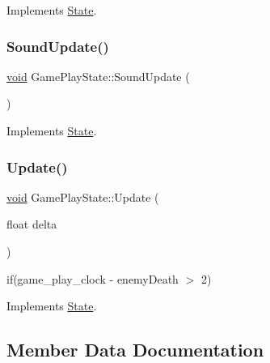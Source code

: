 Implements \hyperlink{classState_a0e48dfae1e3090630475812681417c5f}{State}.

\mbox{\label{classGamePlayState_a3367714db85b4d59a52bc1d8b0828d3c}} 
\subsubsection{\texorpdfstring{Sound\+Update()}{SoundUpdate()}}
{\footnotesize\ttfamily \hyperlink{imgui__impl__opengl3__loader_8h_ac668e7cffd9e2e9cfee428b9b2f34fa7}{void} Game\+Play\+State\+::\+Sound\+Update (\begin{DoxyParamCaption}{ }\end{DoxyParamCaption})\hspace{0.3cm}{\ttfamily [virtual]}}



Implements \hyperlink{classState_a6572089fbf2178bf5c582cc27d6d3925}{State}.

\mbox{\label{classGamePlayState_a19bcc1ff2a83a3aa001010ae35d67b85}} 
\subsubsection{\texorpdfstring{Update()}{Update()}}
{\footnotesize\ttfamily \hyperlink{imgui__impl__opengl3__loader_8h_ac668e7cffd9e2e9cfee428b9b2f34fa7}{void} Game\+Play\+State\+::\+Update (\begin{DoxyParamCaption}\item[{float}]{delta }\end{DoxyParamCaption})\hspace{0.3cm}{\ttfamily [virtual]}}

if(game\+\_\+play\+\_\+clock -\/ enemy\+Death $>$ 2) 

Implements \hyperlink{classState_aac0d3fdee1341e168af730b8f31a7bf1}{State}.



\subsection{Member Data Documentation}
\mbox{\label{classGamePlayState_a0e1217ba99e0bb8098e73ebaa99bdc77}} 
